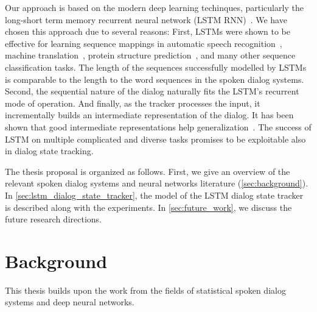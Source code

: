\documentclass[runningheads,a4paper]{llncs}
\begin{document}
Our approach is based on the modern deep learning techinques, particularly the long-short term memory recurrent neural network (LSTM RNN)~\cite{hochreiter1997long}.
We have chosen this approach due to several reasons:
First, LSTMs were shown to be effective for learning sequence mappings in automatic speech recognition~\cite{graves2005framewise}, machine translation~\cite{sutskever2014sequence}, protein structure prediction~\cite{sonderby2014protein}, and many other sequence classification tasks. The length of the sequences successfully modelled by LSTMs is comparable to the length to the word sequences in the spoken dialog systems.
Second, the sequential nature of the dialog naturally fits the LSTM's recurrent mode of operation. And finally, as the tracker processes the input, it incrementally builds an intermediate representation of the dialog. It has been shown that good intermediate representations help generalization~\cite{gulccehre2013knowledge}.
The success of LSTM on multiple complicated and diverse tasks promises to be exploitable also in dialog state tracking.


The thesis proposal is organized as follows. First, we give an overview of the relevant spoken dialog systems and neural networks literature (\autoref{sec:background}). In \autoref{sec:lstm_dialog_state_tracker}, the model of the LSTM dialog state tracker is described along with the experiments. In \autoref{sec:future_work}, we discuss the future research directions.


\section{Background}
\label{sec:background}
This thesis builds upon the work from the fields of statistical spoken dialog systems and deep neural networks.
\end{document}
